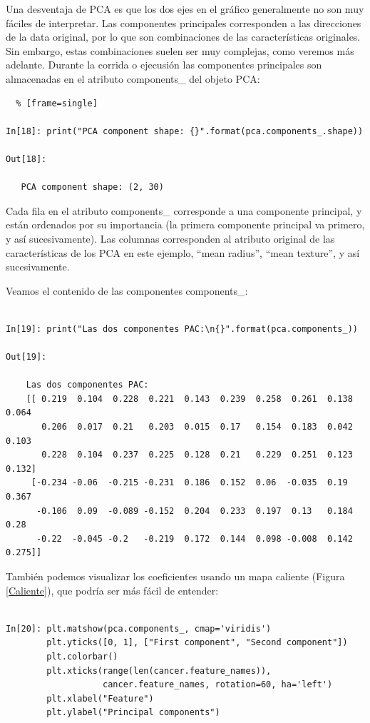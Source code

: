 Una desventaja de PCA es que los dos ejes en el gráfico generalmente  no son muy fáciles de interpretar.
Las componentes principales corresponden a las direcciones de la data  original, por lo que son
combinaciones de las características originales. Sin embargo, estas combinaciones suelen ser muy
complejas, como veremos  más adelante. Durante la corrida o ejecusión  las componentes principales son almacenadas en el atributo  {\ttfamily components\_}  del objeto PCA:\\



\begin{lstlisting}  % [frame=single]	

In[18]: print("PCA component shape: {}".format(pca.components_.shape))

Out[18]:

   PCA component shape: (2, 30)

\end{lstlisting} 

Cada fila en el atributo {\ttfamily components\_  }  corresponde a una componente principal, y están ordenados por  su importancia (la  primera componente principal va primero, y así sucesivamente). Las columnas
corresponden  al atributo original de las características de los PCA en este ejemplo,  “{}mean
radius{}”,   “{}mean texture”{},  y así sucesivamente. 

Veamos el contenido de las componentes {\ttfamily components\_}:

\begin{lstlisting} 

In[19]: print("Las dos componentes PAC:\n{}".format(pca.components_))

Out[19]:
   
    Las dos componentes PAC:
    [[ 0.219  0.104  0.228  0.221  0.143  0.239  0.258  0.261  0.138  0.064
       0.206  0.017  0.21   0.203  0.015  0.17   0.154  0.183  0.042  0.103
       0.228  0.104  0.237  0.225  0.128  0.21   0.229  0.251  0.123  0.132]
     [-0.234 -0.06  -0.215 -0.231  0.186  0.152  0.06  -0.035  0.19   0.367
      -0.106  0.09  -0.089 -0.152  0.204  0.233  0.197  0.13   0.184  0.28
      -0.22  -0.045 -0.2   -0.219  0.172  0.144  0.098 -0.008  0.142  0.275]]

\end{lstlisting}También podemos visualizar los coeficientes usando un mapa caliente (Figura \ref{Caliente}), que podría ser más fácil de entender:

\begin{lstlisting} 

In[20]: plt.matshow(pca.components_, cmap='viridis')
        plt.yticks([0, 1], ["First component", "Second component"])
        plt.colorbar()
        plt.xticks(range(len(cancer.feature_names)),
                   cancer.feature_names, rotation=60, ha='left')
        plt.xlabel("Feature")
        plt.ylabel("Principal components")

\end{lstlisting} 


